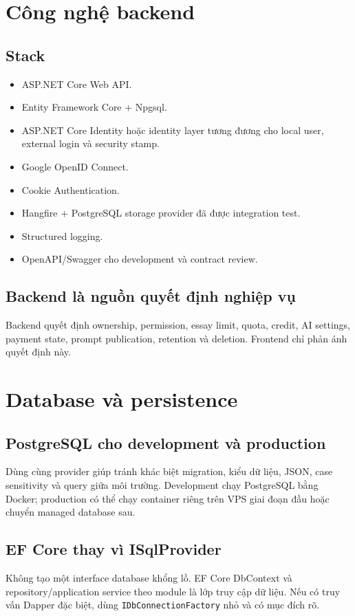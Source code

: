 \documentclass[11pt,a4paper]{article}
\begin{document}
\section{Công nghệ backend}

\subsection{Stack}
\begin{itemize}
  \item ASP.NET Core Web API.
  \item Entity Framework Core + Npgsql.
  \item ASP.NET Core Identity hoặc identity layer tương đương cho local user, external login và security stamp.
  \item Google OpenID Connect.
  \item Cookie Authentication.
  \item Hangfire + PostgreSQL storage provider đã được integration test.
  \item Structured logging.
  \item OpenAPI/Swagger cho development và contract review.
\end{itemize}

\subsection{Backend là nguồn quyết định nghiệp vụ}
Backend quyết định ownership, permission, essay limit, quota, credit, AI settings, payment state, prompt publication, retention và deletion. Frontend chỉ phản ánh quyết định này.

\section{Database và persistence}

\subsection{PostgreSQL cho development và production}
Dùng cùng provider giúp tránh khác biệt migration, kiểu dữ liệu, JSON, case sensitivity và query giữa môi trường. Development chạy PostgreSQL bằng Docker; production có thể chạy container riêng trên VPS giai đoạn đầu hoặc chuyển managed database sau.

\subsection{EF Core thay vì ISqlProvider}
Không tạo một interface database khổng lồ. EF Core DbContext và repository/application service theo module là lớp truy cập dữ liệu. Nếu có truy vấn Dapper đặc biệt, dùng \texttt{IDbConnectionFactory} nhỏ và có mục đích rõ.
\end{document}
